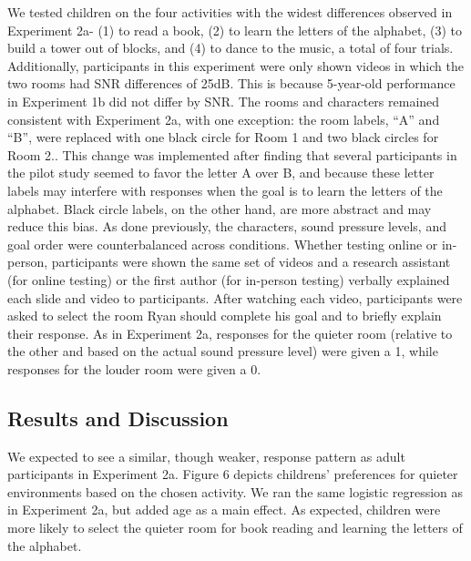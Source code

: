 \documentclass[10pt, letterpaper]{article}
\begin{document}
We tested children on the four activities with the widest differences
observed in Experiment 2a- (1) to read a book, (2) to learn the letters
of the alphabet, (3) to build a tower out of blocks, and (4) to dance to
the music, a total of four trials. Additionally, participants in this
experiment were only shown videos in which the two rooms had SNR
differences of 25dB. This is because 5-year-old performance in
Experiment 1b did not differ by SNR. The rooms and characters remained
consistent with Experiment 2a, with one exception: the room labels,
``A'' and ``B'', were replaced with one black circle for Room 1 and two
black circles for Room 2.. This change was implemented after finding
that several participants in the pilot study seemed to favor the letter
A over B, and because these letter labels may interfere with responses
when the goal is to learn the letters of the alphabet. Black circle
labels, on the other hand, are more abstract and may reduce this bias.
As done previously, the characters, sound pressure levels, and goal
order were counterbalanced across conditions. Whether testing online or
in-person, participants were shown the same set of videos and a research
assistant (for online testing) or the first author (for in-person
testing) verbally explained each slide and video to participants. After
watching each video, participants were asked to select the room Ryan
should complete his goal and to briefly explain their response. As in
Experiment 2a, responses for the quieter room (relative to the other and
based on the actual sound pressure level) were given a 1, while
responses for the louder room were given a 0.

\hypertarget{results-and-discussion-3}{%
\subsection{\texorpdfstring{\textbf{Results and
Discussion}}{Results and Discussion}}\label{results-and-discussion-3}}

We expected to see a similar, though weaker, response pattern as adult
participants in Experiment 2a. Figure 6 depicts childrens' preferences
for quieter environments based on the chosen activity. We ran the same
logistic regression as in Experiment 2a, but added age as a main effect.
As expected, children were more likely to select the quieter room for
book reading and learning the letters of the alphabet.
\end{document}

